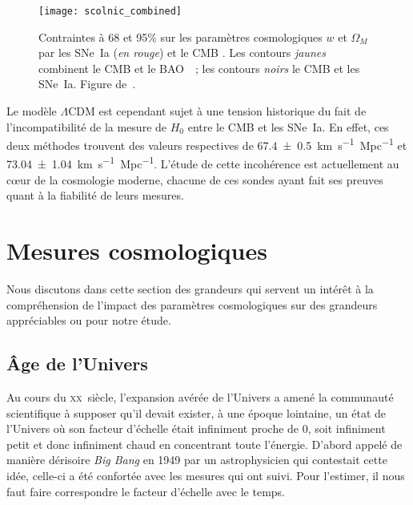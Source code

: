 \documentclass[../main/main.tex]{subfiles}
\begin{document}
\begin{SCfigure}[1][ht]
    \centering
    \texttt{[image: scolnic\_combined]}
    \caption[Contraintes sur les paramètres cosmologiques $w$ et $\Omega_M$ par
    la combinaison SNe~Ia, CMB et BAO]{Contraintes à 68 et 95\% sur les
        paramètres cosmologiques $w$ et $\Omega_M$ par les SNe~Ia (\textit{en
        rouge}) et le CMB \cite[\textit{en bleu}, données de][]{planck2015}. Les
        contours \textit{jaunes} combinent le CMB et le BAO~\citep{alam2015}~;
        les contours \textit{noirs} le CMB et les SNe~Ia. Figure
    de~\cite{scolnic2018}.}\label{fig:cosmocomb}
\end{SCfigure}

Le modèle $\Lambda$CDM est cependant sujet à une tension historique du fait de
l'incompatibilité de la mesure de $H_0$ entre le CMB et les SNe~Ia. En effet,
ces deux méthodes trouvent des valeurs respectives de
\SI{67.4\pm0.5}{km.s^{-1}.Mpc^{-1}} et \SI{73.04\pm1.04}{km.s^{-1}.Mpc^{-1}}.
L'étude de cette incohérence est actuellement au cœur de la cosmologie moderne,
chacune de ces sondes ayant fait ses preuves quant à la fiabilité de leurs
mesures.

\section{Mesures cosmologiques}\label{sec:dist}

Nous discutons dans cette section des grandeurs qui servent un intérêt à la
compréhension de l'impact des paramètres cosmologiques sur des grandeurs
appréciables ou pour notre étude.

\subsection{Âge de l'Univers}\label{ssec:age}

Au cours du \textsc{xx}\ieme~siècle, l'expansion avérée de l'Univers a amené la
communauté scientifique à supposer qu'il devait exister, à une époque lointaine,
un état de l'Univers où son facteur d'échelle était infiniment proche de 0, soit
infiniment petit et donc infiniment chaud en concentrant toute l'énergie.
D'abord appelé de manière dérisoire \textit{Big Bang} en 1949 par un
astrophysicien qui contestait cette idée, celle-ci a été confortée avec les
mesures qui ont suivi. Pour l'estimer, il nous faut faire correspondre le
facteur d'échelle avec le temps.
\end{document}
